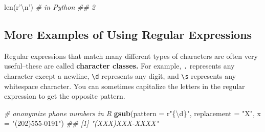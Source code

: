 \documentclass[12pt,krantz2]{krantz}
\makeatletter
\newenvironment{Shaded}{\begin{snugshade}}{\end{snugshade}}
\newcommand{\BuiltInTok}[1]{#1}
\newcommand{\CommentTok}[1]{\textcolor[rgb]{0.37,0.37,0.37}{\textit{#1}}}
\newcommand{\DataTypeTok}[1]{\textcolor[rgb]{0.27,0.27,0.27}{#1}}
\newcommand{\KeywordTok}[1]{\textcolor[rgb]{0.27,0.27,0.27}{\textbf{#1}}}
\newcommand{\NormalTok}[1]{#1}
\newcommand{\OperatorTok}[1]{\textcolor[rgb]{0.43,0.43,0.43}{\textbf{#1}}}
\newcommand{\StringTok}[1]{\textcolor[rgb]{0.5,0.5,0.5}{#1}}
\newcommand{\VerbatimStringTok}[1]{\textcolor[rgb]{0.5,0.5,0.5}{#1}}
\newenvironment{kframe}{%
\medskip{}
\setlength{\fboxsep}{.8em}
 \def\at@end@of@kframe{}%
 \ifinner\ifhmode%
  \def\at@end@of@kframe{\end{minipage}}%
  \begin{minipage}{\columnwidth}%
 \fi\fi%
 \def\FrameCommand##1{\hskip\@totalleftmargin \hskip-\fboxsep
 \colorbox{shadecolor}{##1}\hskip-\fboxsep
     \hskip-\linewidth \hskip-\@totalleftmargin \hskip\columnwidth}%
 \MakeFramed {\advance\hsize-\width
   \@totalleftmargin\z@ \linewidth\hsize
   \@setminipage}}%
 {\par\unskip\endMakeFramed%
 \at@end@of@kframe}
\renewenvironment{Shaded}{\begin{kframe}}{\end{kframe}}
\makeatother
\begin{document}
\begin{Shaded}
\begin{Highlighting}[]
\BuiltInTok{len}\NormalTok{(}\VerbatimStringTok{r'\textbackslash{}n'}\NormalTok{) }\CommentTok{# in Python }
\CommentTok{## 2}
\end{Highlighting}
\end{Shaded}

\begin{Shaded}
\end{Shaded}

\hypertarget{more-examples-of-using-regular-expressions}{%
\subsection{More Examples of Using Regular Expressions}\label{more-examples-of-using-regular-expressions}}

Regular expressions that match many different types of characters are often very useful--these are called \textbf{character classes.} For example, \texttt{.} represents any character except a newline, \texttt{\textbackslash{}d} represents any digit, and \texttt{\textbackslash{}s} represents any whitespace character. You can sometimes capitalize the letters in the regular expression to get the opposite pattern.

\begin{Shaded}
\begin{Highlighting}[]
\CommentTok{# anonymize phone numbers in R}
\KeywordTok{gsub}\NormalTok{(}\DataTypeTok{pattern =}\NormalTok{ r}\StringTok{"\{\textbackslash{}d\}"}\NormalTok{, }\DataTypeTok{replacement =} \StringTok{"X"}\NormalTok{, }\DataTypeTok{x =} \StringTok{"(202)555-0191"}\NormalTok{)}
\CommentTok{## [1] "(XXX)XXX-XXXX"}
\end{Highlighting}
\end{Shaded}

\begin{Shaded}
\end{Shaded}
\end{document}
